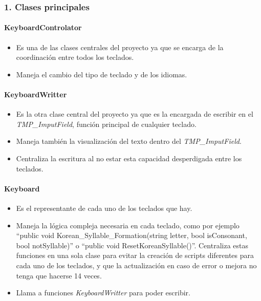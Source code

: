 \subsubsection{1. Clases principales}

\paragraph{\qquad KeyboardControlator} 
\hfill \break %

\begin{itemize}
	\item Es una de las clases centrales del proyecto ya que se encarga de la coordinación entre todos los teclados.
	\item Maneja el cambio del tipo de teclado y de los idiomas.
\end{itemize}

\paragraph{\qquad KeyboardWritter} 
\hfill \break %

\begin{itemize}
	\item Es la otra clase central del proyecto ya que es la encargada de escribir en el \textit{TMP\_ImputField}, función principal de cualquier teclado.
	\item Maneja también la visualización del texto dentro del \textit{TMP\_ImputField}.
	\item Centraliza la escritura al no estar esta capacidad desperdigada entre los teclados.
\end{itemize}

\paragraph{\qquad Keyboard} 
\hfill \break %

\begin{itemize}
	\item Es el representante de cada uno de los teclados que hay.
	\item Maneja la lógica compleja necesaria en cada teclado, como por ejemplo ``public void Korean\_Syllable\_Formation(string letter, bool isConsonant, bool notSyllable)'' o ``public void ResetKoreanSyllable()''. Centraliza estas funciones en una sola clase para evitar la creación de scripts diferentes para cada uno de los teclados, y que la actualización en caso de error o mejora no tenga que hacerse 14 veces.
	\item Llama a funciones \textit{KeyboardWritter} para poder escribir.
	
\end{itemize}

